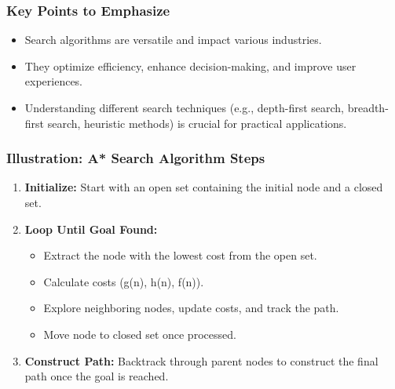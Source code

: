 \documentclass[aspectratio=169]{beamer}
\begin{document}
\begin{frame}
    \frametitle{Key Points to Emphasize}
    \begin{itemize}
        \item Search algorithms are versatile and impact various industries.
        \item They optimize efficiency, enhance decision-making, and improve user experiences.
        \item Understanding different search techniques (e.g., depth-first search, breadth-first search, heuristic methods) is crucial for practical applications.
    \end{itemize}
\end{frame}

\begin{frame}[fragile]
    \frametitle{Illustration: A* Search Algorithm Steps}
    \begin{enumerate}
        \item \textbf{Initialize:} Start with an open set containing the initial node and a closed set.
        \item \textbf{Loop Until Goal Found:}
        \begin{itemize}
            \item Extract the node with the lowest cost from the open set.
            \item Calculate costs (g(n), h(n), f(n)).
            \item Explore neighboring nodes, update costs, and track the path.
            \item Move node to closed set once processed.
        \end{itemize}
        \item \textbf{Construct Path:} Backtrack through parent nodes to construct the final path once the goal is reached.
    \end{enumerate}
\end{frame}
\end{document}

